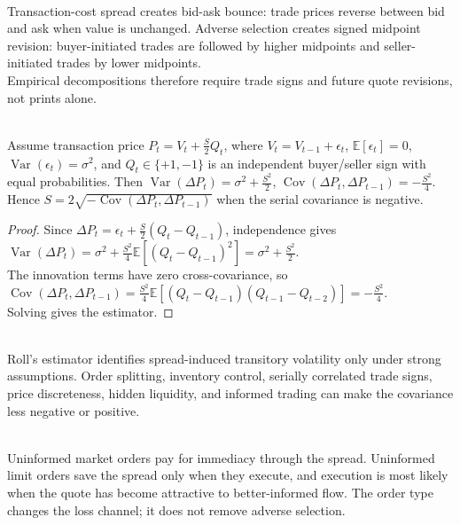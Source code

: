 \begin{mechanism} \\
Transaction-cost spread creates bid-ask bounce: trade prices reverse between bid and ask when value is unchanged. Adverse selection creates signed midpoint revision: buyer-initiated trades are followed by higher midpoints and seller-initiated trades by lower midpoints.\\
Empirical decompositions therefore require trade signs and future quote revisions, not prints alone.
\end{mechanism}

\begin{proposition} \\
Assume transaction price $P_t=V_t+\frac{S}{2}Q_t$, where $V_t=V_{t-1}+\epsilon_t$, $\mathbb{E}[\epsilon_t]=0$, $\operatorname{Var}(\epsilon_t)=\sigma^2$, and $Q_t\in\{+1,-1\}$ is an independent buyer/seller sign with equal probabilities. Then $\operatorname{Var}(\Delta P_t)=\sigma^2+\frac{S^2}{2}$, $\operatorname{Cov}(\Delta P_t,\Delta P_{t-1})=-\frac{S^2}{4}$.\\
Hence $S=2\sqrt{-\operatorname{Cov}(\Delta P_t,\Delta P_{t-1})}$ when the serial covariance is negative.
\begin{proof}
Since $\Delta P_t=\epsilon_t+\frac{S}{2}(Q_t-Q_{t-1})$, independence gives $\operatorname{Var}(\Delta P_t)=\sigma^2+\frac{S^2}{4}\mathbb{E}[(Q_t-Q_{t-1})^2]=\sigma^2+\frac{S^2}{2}$.\\
The innovation terms have zero cross-covariance, so $\operatorname{Cov}(\Delta P_t,\Delta P_{t-1}) =\frac{S^2}{4}\mathbb{E}[(Q_t-Q_{t-1})(Q_{t-1}-Q_{t-2})] =-\frac{S^2}{4}$.\\
Solving gives the estimator.
\end{proof}
\end{proposition}

\begin{caveat} \\
Roll's estimator identifies spread-induced transitory volatility only under strong assumptions. Order splitting, inventory control, serially correlated trade signs, price discreteness, hidden liquidity, and informed trading can make the covariance less negative or positive.
\end{caveat}

\begin{principle} \\
Uninformed market orders pay for immediacy through the spread. Uninformed limit orders save the spread only when they execute, and execution is most likely when the quote has become attractive to better-informed flow. The order type changes the loss channel; it does not remove adverse selection.
\end{principle}

